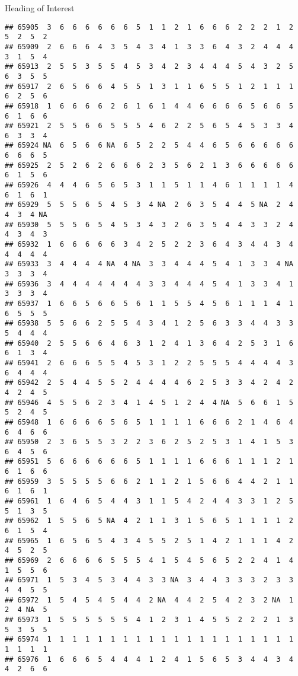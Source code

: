 \documentclass[
  ignorenonframetext,
]{beamer}
\begin{document}
\begin{frame}[fragile]{Heading of Interest}
\begin{verbatim}
## 65905  3  6  6  6  6  6  6  5  1  1  2  1  6  6  6  2  2  2  1  2  5  2  5  2
## 65909  2  6  6  6  4  3  5  4  3  4  1  3  3  6  4  3  2  4  4  4  3  1  5  4
## 65913  2  5  5  3  5  5  4  5  3  4  2  3  4  4  4  5  4  3  2  5  6  3  5  5
## 65917  2  6  5  6  6  4  5  5  1  3  1  1  6  5  5  1  2  1  1  1  6  2  5  6
## 65918  1  6  6  6  6  2  6  1  6  1  4  4  6  6  6  6  5  6  6  5  6  1  6  6
## 65921  2  5  5  6  6  5  5  5  4  6  2  2  5  6  5  4  5  3  3  4  6  3  3  4
## 65924 NA  6  5  6  6 NA  6  5  2  2  5  4  4  6  5  6  6  6  6  6  6  6  6  5
## 65925  2  5  2  6  2  6  6  6  2  3  5  6  2  1  3  6  6  6  6  6  6  1  5  6
## 65926  4  4  4  6  5  6  5  3  1  1  5  1  1  4  6  1  1  1  1  4  6  1  6  1
## 65929  5  5  5  6  5  4  5  3  4 NA  2  6  3  5  4  4  5 NA  2  4  4  3  4 NA
## 65930  5  5  5  6  5  4  5  3  4  3  2  6  3  5  4  4  3  3  2  4  4  3  4  3
## 65932  1  6  6  6  6  6  3  4  2  5  2  2  3  6  4  3  4  4  3  4  4  4  4  4
## 65933  3  4  4  4  4 NA  4 NA  3  3  4  4  4  5  4  1  3  3  4 NA  3  3  3  4
## 65936  3  4  4  4  4  4  4  4  3  3  4  4  4  5  4  1  3  3  4  1  3  3  3  4
## 65937  1  6  6  5  6  6  5  6  1  1  5  5  4  5  6  1  1  1  4  1  6  5  5  5
## 65938  5  5  6  6  2  5  5  4  3  4  1  2  5  6  3  3  4  4  3  3  5  4  4  4
## 65940  2  5  5  6  6  4  6  3  1  2  4  1  3  6  4  2  5  3  1  6  6  1  3  4
## 65941  2  6  6  6  5  5  4  5  3  1  2  2  5  5  5  4  4  4  4  3  6  4  4  4
## 65942  2  5  4  4  5  5  2  4  4  4  4  6  2  5  3  3  4  2  4  2  4  2  4  5
## 65946  4  5  5  6  2  3  4  1  4  5  1  2  4  4 NA  5  6  6  1  5  5  2  4  5
## 65948  1  6  6  6  6  5  6  5  1  1  1  1  6  6  6  2  1  4  6  4  6  4  6  6
## 65950  2  3  6  5  5  3  2  2  3  6  2  5  2  5  3  1  4  1  5  3  6  4  5  6
## 65951  5  6  6  6  6  6  6  5  1  1  1  1  6  6  6  1  1  1  2  1  6  1  6  6
## 65959  3  5  5  5  5  6  6  2  1  1  2  1  5  6  6  4  4  2  1  1  6  1  6  1
## 65961  1  6  4  6  5  4  4  3  1  1  5  4  2  4  4  3  3  1  2  5  5  1  3  5
## 65962  1  5  5  6  5 NA  4  2  1  1  3  1  5  6  5  1  1  1  1  2  6  1  5  4
## 65965  1  6  5  6  5  4  3  4  5  5  2  5  1  4  2  1  1  1  4  2  4  5  2  5
## 65969  2  6  6  6  6  5  5  5  4  1  5  4  5  6  5  2  2  4  1  4  1  5  5  6
## 65971  1  5  3  4  5  3  4  4  3  3 NA  3  4  4  3  3  3  2  3  3  4  4  5  5
## 65972  1  5  4  5  4  5  4  4  2 NA  4  4  2  5  4  2  3  2 NA  1  2  4 NA  5
## 65973  1  5  5  5  5  5  5  4  1  2  3  1  4  5  5  2  2  2  1  3  5  3  5  5
## 65974  1  1  1  1  1  1  1  1  1  1  1  1  1  1  1  1  1  1  1  1  1  1  1  1
## 65976  1  6  6  6  5  4  4  4  1  2  4  1  5  6  5  3  4  4  3  4  4  2  6  6

\end{verbatim}
\end{frame}
\end{document}
